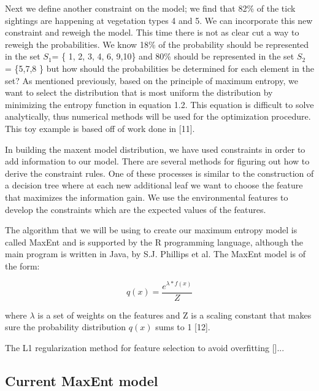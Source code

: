 \noindent Next we define another constraint on the model; we find that 82\% of the tick sightings are happening at vegetation types 4 and 5. We can incorporate this new constraint and reweigh the model. This time there is not as clear cut a way to reweigh the probabilities. We know 18\% of the probability should be represented in the set $S_1$= \{ 1, 2, 3, 4, 6, 9,10\} and 80\% should be represented in the set $S_2$ = \{5,7,8 \} but how should the probabilities be determined for each element in the set? As mentioned previously, based on the principle of maximum entropy, we want to select the distribution that is most uniform the distribution by minimizing the entropy function in equation 1.2. This equation is difficult to solve analytically, thus numerical methods will be used for the optimization procedure. This toy example is based off of work done in [11]. \newline

\noindent In building the maxent model distribution, we have used constraints in order to add information to our model. There are several methods for figuring out how to derive the constraint rules. One of these processes is similar to the construction of a decision tree where at each new additional leaf we want to choose the feature that maximizes the information gain. We use the environmental features to develop the constraints which are the expected values of the features.\newline

\noindent The algorithm that we will be using to create our maximum entropy model is called MaxEnt and is supported by the R programming language, although the main program is written in Java, by S.J. Phillips et al. The MaxEnt model is of the form:


\begin{equation}
q(x) = \frac{e^{\lambda* f(x)}}{Z}
\end{equation}

\noindent where $\lambda $ is a set of weights on the features and Z is a scaling constant that makes sure the probability distribution $q(x)$ sums to 1 [12]. \newline 


\noindent The L1 regularization method for feature selection to avoid overfitting []... \newline

\subsection{Current MaxEnt model}

